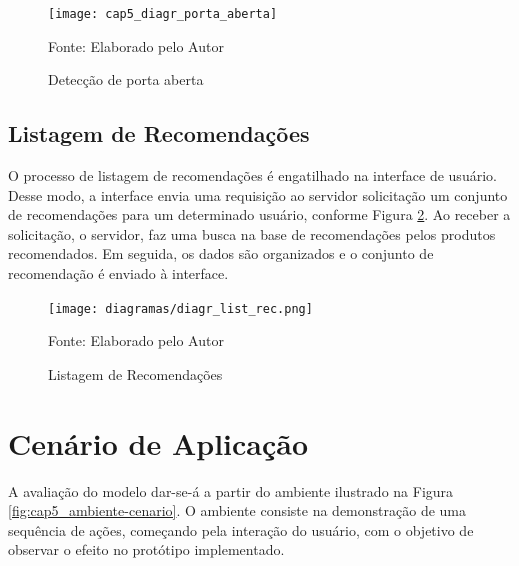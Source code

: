 \begin{figure}[htb]
    \caption{Detecção de porta aberta}
    \label{fig:cap5_diagr_porta_aberta}
    \texttt{[image: cap5\_diagr\_porta\_aberta]}
    
    \footnotesize{Fonte: Elaborado pelo Autor}
\end{figure}

\subsection{Listagem de Recomendações} \label{ssec:listagem_rec}

O processo de listagem de recomendações é engatilhado na interface de usuário. Desse modo, a interface envia uma requisição ao servidor solicitação um conjunto de recomendações para um determinado usuário, conforme Figura \ref{fig:cap5_diagr_lista_rec}.  Ao receber a solicitação, o servidor, faz uma busca na base de recomendações pelos produtos recomendados. Em seguida, os dados são organizados e o conjunto de recomendação é enviado à interface.

\begin{figure}[htb]
    \caption{Listagem de Recomendações}
    \label{fig:cap5_diagr_lista_rec}
    \texttt{[image: diagramas/diagr\_list\_rec.png]}
    
    \footnotesize{Fonte: Elaborado pelo Autor}
\end{figure}


\section{Cenário de Aplicação}

A avaliação do modelo dar-se-á a partir do ambiente ilustrado na Figura \ref{fig:cap5_ambiente-cenario}. O ambiente consiste na demonstração de uma sequência de ações, começando pela interação do usuário, com o objetivo de observar o efeito no protótipo implementado.

